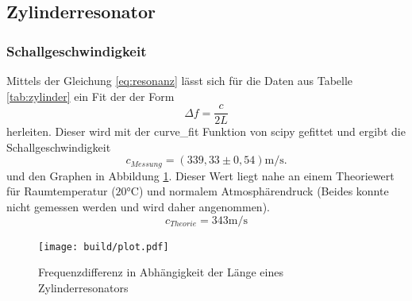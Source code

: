 \subsection{Zylinderresonator}
\subsubsection{Schallgeschwindigkeit}
Mittels der Gleichung \eqref{eq:resonanz} lässt sich für die Daten aus Tabelle \ref{tab:zylinder} ein Fit der der Form
\begin{equation}
  \Delta f = \frac{c}{2L}
\end{equation}
herleiten. Dieser wird mit der curve\_fit Funktion von scipy \cite{scipy} gefittet und ergibt die Schallgeschwindigkeit
\begin{equation}
  c_{Messung} =(339,33\pm 0,54)\si{\metre\per\second}.
\end{equation}
und den Graphen in Abbildung \ref{fig:plot_zylinder}.
Dieser Wert liegt nahe an einem Theoriewert für Raumtemperatur ($20°$C) und normalem Atmosphärendruck (Beides konnte nicht gemessen werden und wird daher angenommen).
\begin{equation}
  c_{Theorie} =343\si{\metre\per\second}
\end{equation}


\begin{figure}
  \centering
  \texttt{[image: build/plot.pdf]}
  \caption{Frequenzdifferenz in Abhängigkeit der Länge eines Zylinderresonators}
  \label{fig:plot_zylinder}
\end{figure}

